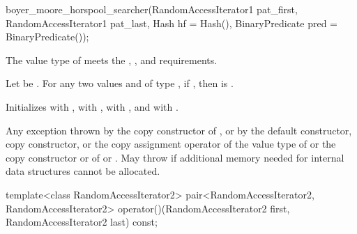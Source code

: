 %
\begin{itemdecl}
boyer_moore_horspool_searcher(RandomAccessIterator1 pat_first,
                              RandomAccessIterator1 pat_last,
                              Hash hf = Hash(),
                              BinaryPredicate pred = BinaryPredicate());
\end{itemdecl}

\begin{itemdescr}
\pnum
\expects
The value type of  meets the ,
, and  requirements.

\pnum
\expects
Let  be .
For any two values  and  of type ,
if , then  is .

\pnum
\effects
Initializes
 with ,
 with ,
 with , and
 with .

\pnum
\throws
Any exception thrown by the copy constructor of ,
or by the default constructor, copy constructor, or the copy assignment operator of the value type of 
or the copy constructor or  of  or .
May throw  if additional memory needed for internal data structures cannot be allocated.
\end{itemdescr}

%
\begin{itemdecl}
template<class RandomAccessIterator2>
  pair<RandomAccessIterator2, RandomAccessIterator2>
    operator()(RandomAccessIterator2 first, RandomAccessIterator2 last) const;
\end{itemdecl}

